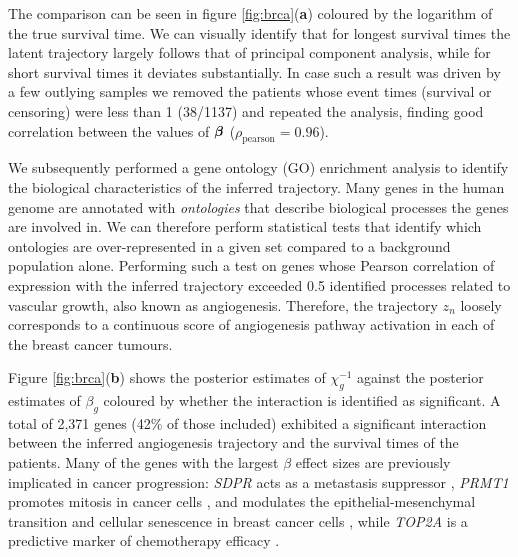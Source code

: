 The comparison can be seen in figure \ref{fig:brca}(\textbf{a}) coloured by the logarithm of the true survival time. We can visually identify that for longest survival times the latent trajectory largely follows that of principal component analysis, while for short survival times it deviates substantially. In case such a result was driven by a few outlying samples we removed the patients whose event times (survival or censoring) were less than 1 (38/1137) and repeated the analysis, finding good correlation between the values of $\bm{\beta}$ ($\rho_{\text{pearson}} = 0.96$).

We subsequently performed a gene ontology (GO) enrichment analysis to identify the biological characteristics of the inferred trajectory. Many genes in the human genome are annotated with \emph{ontologies} that describe biological processes the genes are involved in. We can therefore perform statistical tests \citep{young2010gene} that identify which ontologies are over-represented in a given set compared to a background population alone. Performing such a test on genes whose Pearson correlation of expression with the inferred trajectory exceeded 0.5 identified processes related to vascular growth, also known as angiogenesis. Therefore, the trajectory $z_n$ loosely corresponds to a continuous score of angiogenesis pathway activation in each of the breast cancer tumours.


Figure \ref{fig:brca}(\textbf{b}) shows the posterior estimates of $\chi_g^{-1}$ against the posterior estimates of $\beta_g$ coloured by whether the interaction is identified as significant. %
A total of 2,371 genes (42\% of those included) exhibited a significant interaction between the inferred angiogenesis trajectory and the survival times of the patients. Many of the genes with the largest $\beta$ effect sizes are previously implicated in cancer progression: \emph{SDPR} acts as a metastasis suppressor \citep{ozturk2016sdpr}, \emph{PRMT1} promotes mitosis in
cancer cells \citep{deng2015prmt1}, and modulates the epithelial-mesenchymal transition and cellular senescence in breast cancer cells \citep{gao2016dual}, while \emph{TOP2A} is a predictive marker of chemotherapy efficacy \citep{wang2012top2a}.

